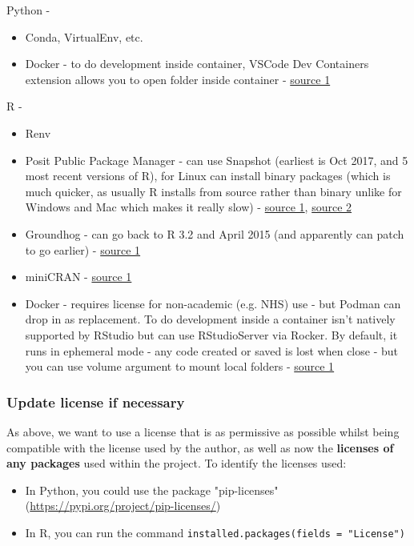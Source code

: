 Python -
\begin{itemize}
    \item Conda, VirtualEnv, etc.
    \item Docker - to do development inside container, VSCode Dev Containers extension allows you to open folder inside container - \href{https://code.visualstudio.com/docs/devcontainers/containers}{source 1}
\end{itemize}

R -
\begin{itemize}
    \item Renv
    \item Posit Public Package Manager - can use Snapshot (earliest is Oct 2017, and 5 most recent versions of R), for Linux can install binary packages (which is much quicker, as usually R installs from source rather than binary unlike for Windows and Mac which makes it really slow) - \href{https://packagemanager.posit.co/client/#/repos/cran/setup}{source 1}, \href{https://docs.posit.co/faq/p3m-faq/#frequently-asked-questions}{source 2}
    \item Groundhog - can go back to R 3.2 and April 2015 (and apparently can patch to go earlier) - \href{https://www.brodrigues.co/blog/2023-01-12-repro_r/}{source 1}
    \item miniCRAN - \href{https://learn.microsoft.com/en-us/sql/machine-learning/package-management/create-a-local-package-repository-using-minicran?view=sql-server-ver16}{source 1}
    \item Docker - requires license for non-academic (e.g. NHS) use - but Podman can drop in as replacement. To do development inside a container isn't natively supported by RStudio but can use RStudioServer via Rocker. By default, it runs in ephemeral mode - any code created or saved is lost when close - but you can use volume argument to mount local folders - \href{https://towardsdatascience.com/running-rstudio-inside-a-container-e9db5e809ff8}{source 1}
\end{itemize}

\subsubsection{Update license if necessary}
\timeyes

As above, we want to use a license that is as permissive as possible whilst being compatible with the license used by the author, as well as now the \textbf{licenses of any packages} used within the project. To identify the licenses used:
\begin{itemize}
    \item In Python, you could use the package "pip-licenses" (\url{https://pypi.org/project/pip-licenses/})
    \item In R, you can run the command \texttt{installed.packages(fields = "License")}
\end{itemize}

